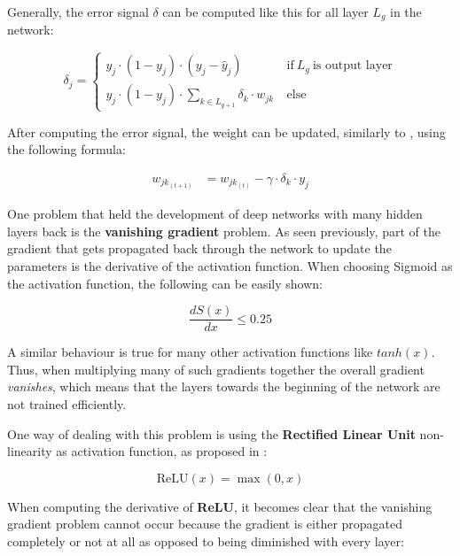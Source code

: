 Generally, the error signal $\delta$ can be computed like this for all layer $L_g$ in the network:

\begin{equation}
    \delta_j =
    \begin{cases}
        y_j \cdot (1 - y_j) \cdot (y_j - \hat{y}_j) & ~ \text{if} ~ L_g ~ \text{is output layer} \\
        y_j \cdot (1 - y_j) \cdot \sum_{k \in L_{g+1}} \delta_k \cdot w_{jk} & ~ \text{else}
    \end{cases}
\end{equation}

After computing the error signal, the weight can be updated, similarly to , using the following formula:

\begin{equation}
    \begin{split}
        w_{jk_{(t+1)}}
        &= w_{jk_{(t)}}  - \gamma \cdot \delta_k \cdot y_j
    \end{split}
\end{equation}

One problem that held the development of deep networks with many hidden layers back is the \textbf{vanishing gradient} problem.
As seen previously, part of the gradient that gets propagated back through the network to update the parameters is the derivative of the activation function.
When choosing Sigmoid as the activation function, the following can be easily shown:

\begin{equation}
    \frac{dS(x)}{dx} \leq 0.25
\end{equation}

A similar behaviour is true for many other activation functions like $tanh(x)$.
Thus, when multiplying many of such gradients together the overall gradient \textit{vanishes}, which means that the layers towards the beginning of the network are not trained efficiently.

One way of dealing with this problem is using the \textbf{Rectified Linear Unit} non-linearity as activation function, as proposed in \cite{nair_rectified_2010}:

\begin{equation}
    \text{ReLU}(x) = \max (0, x)
\end{equation}

When computing the derivative of \textbf{ReLU}, it becomes clear that the vanishing gradient problem cannot occur because the gradient is either propagated completely or not at all as opposed to being diminished with every layer:

